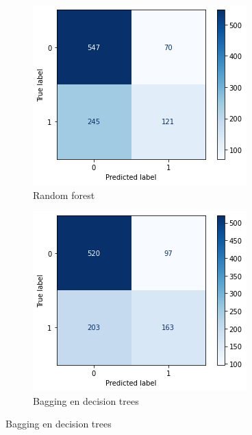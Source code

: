 \documentclass{article}
\begin{document}
\begin{figure}[!h]
	\centering
	\begin{subfigure}[b]{0.25\textwidth}
		\centering
		\includegraphics[width=\textwidth]{../images/cmatrix-random-forest}
		\caption*{Random forest}
		\label{fig:knn}
	\end{subfigure}
	\begin{subfigure}[b]{0.25\textwidth}
		\centering
		\includegraphics[width=\textwidth]{../images/cmatrix-bagging-decisiontrees}
		\caption*{Bagging en decision trees}
		\label{fig:three sin x}
	\end{subfigure}
\end{figure}
\end{document}
